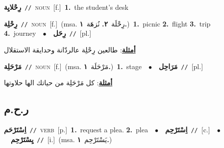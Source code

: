 \documentclass[10pt,a4paper,twoside]{article} %
\begin{document}
\begin{multicols}{2}
{\setlength\topsep{0pt}\textbf{\foreignlanguage{arabic}{رِحْلايِة}}\ {\color{gray}\texttt{//}\color{black}}\ \textsc{noun}\ [f.]\ \textbf{1.}~the student's desk\ } \vspace{2mm}

{\setlength\topsep{0pt}\textbf{\foreignlanguage{arabic}{رِحْلِة}}\ {\color{gray}\texttt{//}\color{black}}\ \textsc{noun}\ [f.]\ \color{gray}(msa. \foreignlanguage{arabic}{رِحْلَة}~\foreignlanguage{arabic}{\textbf{٢.}}  \foreignlanguage{arabic}{نُزهَة}~\foreignlanguage{arabic}{\textbf{١.}})\color{black}\ \textbf{1.}~picnic  \textbf{2.}~flight  \textbf{3.}~trip  \textbf{4.}~journey\ \ $\bullet$\ \ \setlength\topsep{0pt}\textbf{\foreignlanguage{arabic}{رِحَل}}\ {\color{gray}\texttt{//}\color{black}}\ [pl.]\  \begin{flushright}\color{gray}\foreignlanguage{arabic}{\textbf{\underline{\foreignlanguage{arabic}{أمثلة}}}: طالعين رِحْلِة عالردّانة وحدايقة الاستقلال}\end{flushright}\color{black}} \vspace{2mm}

{\setlength\topsep{0pt}\textbf{\foreignlanguage{arabic}{مَرْحَلِة}}\ {\color{gray}\texttt{//}\color{black}}\ \textsc{noun}\ [f.]\ \color{gray}(msa. \foreignlanguage{arabic}{مَرْحَلَة}~\foreignlanguage{arabic}{\textbf{١.}})\color{black}\ \textbf{1.}~stage\ \ $\bullet$\ \ \setlength\topsep{0pt}\textbf{\foreignlanguage{arabic}{مَرَاحِل}}\ {\color{gray}\texttt{//}\color{black}}\ [pl.]\  \begin{flushright}\color{gray}\foreignlanguage{arabic}{\textbf{\underline{\foreignlanguage{arabic}{أمثلة}}}: كل مَرْحَلِة من حياتك الها حلاوتها}\end{flushright}\color{black}} \vspace{2mm}

\vspace{-3mm}
\subsection*{\color{blue}\foreignlanguage{arabic}{ر.ح.م}\color{blue}{}} 

{\setlength\topsep{0pt}\textbf{\foreignlanguage{arabic}{اِسْتَرْحَم}}\ {\color{gray}\texttt{//}\color{black}}\ \textsc{verb}\ [p.]\ \textbf{1.}~request a plea.  \textbf{2.}~plea\ \ $\bullet$\ \ \setlength\topsep{0pt}\textbf{\foreignlanguage{arabic}{اِسْتَرْحِم}}\ {\color{gray}\texttt{//}\color{black}}\ [c.]\ \ $\bullet$\ \ \setlength\topsep{0pt}\textbf{\foreignlanguage{arabic}{يِسْتَرْحِم}}\ {\color{gray}\texttt{//}\color{black}}\ [i.]\ \color{gray}(msa. \foreignlanguage{arabic}{يَسْتَرْحِم}~\foreignlanguage{arabic}{\textbf{١.}})\color{black}\ } \vspace{2mm}


\end{multicols}
\end{document}
